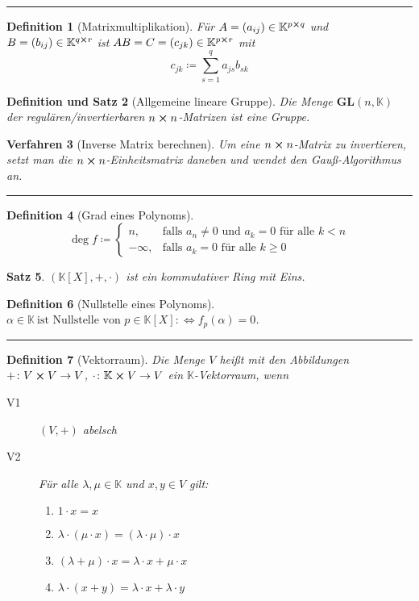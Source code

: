\documentclass[a4paper]{article}
\newcounter{Sec}
\theoremstyle{marginbreak}
\newtheorem{definition}{Definition}[Sec]
\newtheorem{satz}[definition]{Satz}
\newtheorem{defsatz}[definition]{Definition und Satz}
\newtheorem{verfahren}[definition]{Verfahren}
\newcommand{\sep}{%
	\rule{\textwidth}{0.3pt}%
	\stepcounter{Sec}%
	}
\begin{document}
	\sep
	\begin{definition}[Matrixmultiplikation]
		Für $A = (a_{ij}) \in \mathbb{K}^{p\cross q}$ und $B = (b_{ij}) \in \mathbb{K}^{q\cross r}$
		ist $AB = C = (c_{jk}) \in \mathbb{K}^{p\cross r}$ mit
		\[ c_{jk} \coloneqq \sum_{s = 1}^q a_{js}b_{sk}\]
	\end{definition}
	\begin{defsatz}[Allgemeine lineare Gruppe]
		Die Menge $\mathbf{GL}(n, \mathbb{K})$ der regulären/invertierbaren $n\cross n$-Matrizen ist eine Gruppe.
	\end{defsatz}
	\begin{verfahren}[Inverse Matrix berechnen]
		Um eine $n\cross n$-Matrix zu invertieren, setzt man die $n\cross n$-Einheitsmatrix daneben und wendet
		den Gauß-Algorithmus an.
	\end{verfahren}
	\sep
	\begin{definition}[Grad eines Polynoms]
		\[\deg f\coloneqq\begin{cases}
			n, &\text{falls $a_n \neq 0$ und $a_k = 0$ für alle $k < n$}\\
			-\infty,  &\text{falls $a_k = 0$ für alle $k \geq 0$}
		\end{cases}\]
	\end{definition}
	\begin{satz}
		$(\mathbb{K}[X], +, \cdot)$ ist ein kommutativer Ring mit Eins.
	\end{satz}
	\begin{definition}[Nullstelle eines Polynoms]
		$\alpha\in\mathbb{K}~\text{ist Nullstelle von $p\in\mathbb{K}[X]$} :\Longleftrightarrow f_p(\alpha) = 0$.
	\end{definition}
	\sep
	\begin{definition}[Vektorraum]
		Die Menge $V$ heißt mit den Abbildungen $+\colon V\cross V\to V$, $\cdot\colon\mathbb{K}\cross V\to V$ ein $\mathbb{K}$-Vektorraum, wenn
		\begin{description}
			\item[V1] $(V, +)$ abelsch
			\item[V2] Für alle $\lambda,\mu\in\mathbb{K}$ und $x, y\in V$ gilt:
				\begin{enumerate}[label=(\alph*)]
					\item $1 \cdot x = x$
					\item $\lambda \cdot (\mu \cdot x) = (\lambda \cdot \mu) \cdot x$
					\item $(\lambda + \mu) \cdot x = \lambda \cdot x + \mu \cdot x$
					\item $\lambda \cdot (x + y) = \lambda \cdot x + \lambda \cdot y$
				\end{enumerate}
		\end{description}
	\end{definition}
\end{document}
